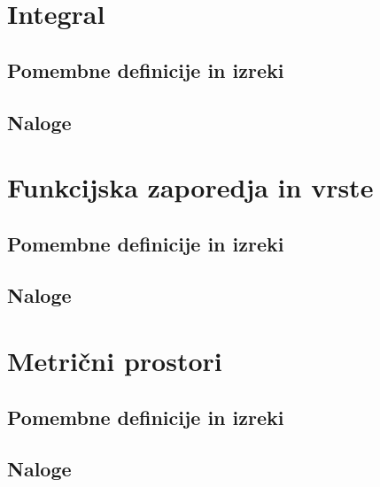 \documentclass[a4paper,12pt]{report}
\begin{document}
\chapter{Integral}

\section*{Pomembne definicije in izreki}

\pagebreak

\section*{Naloge}


\chapter{Funkcijska zaporedja in vrste}

\section*{Pomembne definicije in izreki}

\pagebreak

\section*{Naloge}


\chapter{Metrični prostori}

\section*{Pomembne definicije in izreki}

\pagebreak

\section*{Naloge}
\end{document}
